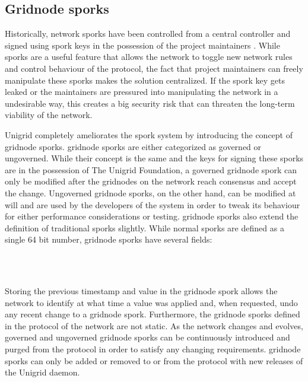 \documentclass[10pt,a4paper,final]{article}
\begin{document}
\subsection{Gridnode sporks}
Historically, network sporks have been controlled from a central controller and signed using spork keys in the possession of the project maintainers \cite{dashref2017}. While sporks are a useful feature that allows the network to toggle new network rules and control behaviour of the protocol, the fact that project maintainers can freely manipulate these sporks makes the solution centralized. If the spork key gets leaked or the maintainers are pressured into manipulating the network in a undesirable way, this creates a big security risk that can threaten the long-term viability of the network.

Unigrid completely ameliorates the spork system by introducing the concept of \gls{gridnode} sporks. \Gls{gridnode} sporks are either categorized as governed or ungoverned. While their concept is the same and the keys for signing these sporks are in the possession of The Unigrid Foundation, a governed \gls{gridnode} spork can only be modified after the \glspl{gridnode} on the network reach consensus and accept the change. Ungoverned \gls{gridnode} sporks, on the other hand, can be modified at will and are used by the developers of the system in order to tweak its behaviour for either performance considerations or testing. \Gls{gridnode} sporks also extend the definition of traditional sporks slightly. While normal sporks are defined as a single 64 bit number, \gls{gridnode} sporks have several fields:

\bigskip
\begin{noindent}
	\begin{bytefield}[bitwidth=0.27em]{64}
		 \\
		 \\
	\end{bytefield}
\end{noindent}

\noindent Storing the previous timestamp and value in the \gls{gridnode} spork allows the network to identify at what time a value was applied and, when requested, undo any recent change to a \gls{gridnode} spork. Furthermore, the \gls{gridnode} sporks defined in the protocol of the network are not static. As the network changes and evolves, governed and ungoverned \gls{gridnode} sporks can be continuously introduced and purged from the protocol in order to satisfy any changing requirements. \Gls{gridnode} sporks can only be added or removed to or from the protocol with new releases of the Unigrid daemon.
\end{document}
